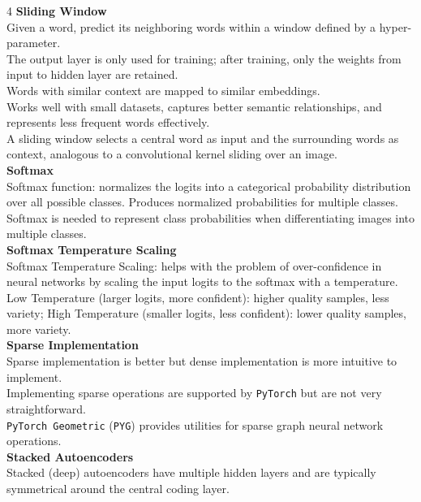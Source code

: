 \documentclass[8pt]{extarticle}
\begin{document}
\begin{multicols}{4}
{\vspace{2pt}\textbf{Sliding Window}\\
Given a word, predict its neighboring words within a window defined by a hyper-parameter.\\
The output layer is only used for training; after training, only the weights from input to hidden layer are retained.\\
Words with similar context are mapped to similar embeddings.\\
Works well with small datasets, captures better semantic relationships, and represents less frequent words effectively.\\
A sliding window selects a central word as input and the surrounding words as context, analogous to a convolutional kernel sliding over an image.\\
\vspace{2pt}\textbf{Softmax}\\
Softmax function: normalizes the logits into a categorical probability distribution over all possible classes. Produces normalized probabilities for multiple classes.\\
Softmax is needed to represent class probabilities when differentiating images into multiple classes.\\
\vspace{2pt}\textbf{Softmax Temperature Scaling}\\
Softmax Temperature Scaling: helps with the problem of over-confidence in neural networks by scaling the input logits to the softmax with a temperature.\\
Low Temperature (larger logits, more confident): higher quality samples, less variety; High Temperature (smaller logits, less confident): lower quality samples, more variety.\\
\vspace{2pt}\textbf{Sparse Implementation}\\
Sparse implementation is better but dense implementation is more intuitive to implement.\\
Implementing sparse operations are supported by \texttt{PyTorch} but are not very straightforward.\\
\texttt{PyTorch Geometric} (\texttt{PYG}) provides utilities for sparse graph neural network operations.\\
\vspace{2pt}\textbf{Stacked Autoencoders}\\
Stacked (deep) autoencoders have multiple hidden layers and are typically symmetrical around the central coding layer.\\
}
\end{multicols}
\end{document}
